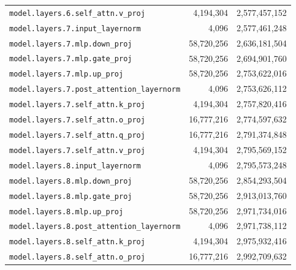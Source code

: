\documentclass[10pt,a4paper]{article}
\theoremstyle{definition}
\begin{document}
\begin{appendices}
\begin{longtable}{p{9.5cm}rr}
\texttt{model.\allowbreak{}layers.\allowbreak{}6.\allowbreak{}self\_attn.\allowbreak{}v\_proj} & 4,194,304 & 2,577,457,152 \\
\texttt{model.\allowbreak{}layers.\allowbreak{}7.\allowbreak{}input\_layernorm} & 4,096 & 2,577,461,248 \\
\texttt{model.\allowbreak{}layers.\allowbreak{}7.\allowbreak{}mlp.\allowbreak{}down\_proj} & 58,720,256 & 2,636,181,504 \\
\texttt{model.\allowbreak{}layers.\allowbreak{}7.\allowbreak{}mlp.\allowbreak{}gate\_proj} & 58,720,256 & 2,694,901,760 \\
\texttt{model.\allowbreak{}layers.\allowbreak{}7.\allowbreak{}mlp.\allowbreak{}up\_proj} & 58,720,256 & 2,753,622,016 \\
\texttt{model.\allowbreak{}layers.\allowbreak{}7.\allowbreak{}post\_attention\_layernorm} & 4,096 & 2,753,626,112 \\
\texttt{model.\allowbreak{}layers.\allowbreak{}7.\allowbreak{}self\_attn.\allowbreak{}k\_proj} & 4,194,304 & 2,757,820,416 \\
\texttt{model.\allowbreak{}layers.\allowbreak{}7.\allowbreak{}self\_attn.\allowbreak{}o\_proj} & 16,777,216 & 2,774,597,632 \\
\texttt{model.\allowbreak{}layers.\allowbreak{}7.\allowbreak{}self\_attn.\allowbreak{}q\_proj} & 16,777,216 & 2,791,374,848 \\
\texttt{model.\allowbreak{}layers.\allowbreak{}7.\allowbreak{}self\_attn.\allowbreak{}v\_proj} & 4,194,304 & 2,795,569,152 \\
\texttt{model.\allowbreak{}layers.\allowbreak{}8.\allowbreak{}input\_layernorm} & 4,096 & 2,795,573,248 \\
\texttt{model.\allowbreak{}layers.\allowbreak{}8.\allowbreak{}mlp.\allowbreak{}down\_proj} & 58,720,256 & 2,854,293,504 \\
\texttt{model.\allowbreak{}layers.\allowbreak{}8.\allowbreak{}mlp.\allowbreak{}gate\_proj} & 58,720,256 & 2,913,013,760 \\
\texttt{model.\allowbreak{}layers.\allowbreak{}8.\allowbreak{}mlp.\allowbreak{}up\_proj} & 58,720,256 & 2,971,734,016 \\
\texttt{model.\allowbreak{}layers.\allowbreak{}8.\allowbreak{}post\_attention\_layernorm} & 4,096 & 2,971,738,112 \\
\texttt{model.\allowbreak{}layers.\allowbreak{}8.\allowbreak{}self\_attn.\allowbreak{}k\_proj} & 4,194,304 & 2,975,932,416 \\
\texttt{model.\allowbreak{}layers.\allowbreak{}8.\allowbreak{}self\_attn.\allowbreak{}o\_proj} & 16,777,216 & 2,992,709,632 \\

\end{longtable}
\end{appendices}
\end{document}
